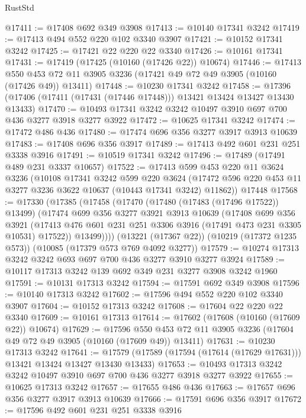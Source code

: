 \begin{lexlean}{RustStd}
\begin{coremodule}
@17411 := @17408 @692 @349 @3908
@17413 := @10140 @17341 @3242
@17419 := @17413 @494 @552 @220 @102 @3340 @3907
@17421 := @10152 @17341 @3242
@17425 := @17421 @22 @220 @22 @3340
@17426 := @10161 @17341
@17431 := @17419 (@17425 (@10160 (@17426 @22)) @10674)
@17446 := @17413
    @550
    @453
    @72
    @11
    @3905
    @3236
    (@17421 @49 @72 @49 @3905 (@10160 (@17426 @49)) @13411)
@17448 := @10230 @17341 @3242
@17458 := @17396 (@17406 (@17411 (@17431 (@17446 @17448))) @13421 @13424 @13427 @13430 @13433)
@17470 := @10493 @17341 @3242 @3242 @10497 @3910 @697 @700 @436 @3277 @3918 @3277 @3922
@17472 := @10625 @17341 @3242
@17474 := @17472 @486 @436
@17480 := @17474 @696 @356 @3277 @3917 @3913 @10639
@17483 := @17408 @696 @356 @3917
@17489 := @17413 @492 @601 @231 @251 @3338 @3916
@17491 := @10519 @17341 @3242
@17496 := @17489 (@17491 @489 @231 @3337 @10657)
@17522 := @17413
    @599
    @453
    @220
    @11
    @3624
    @3236
    (@10108
      @17341
      @3242
      @599
      @220
      @3624
      (@17472 @596 @220 @453 @11 @3277 @3236 @3622 @10637 (@10443 @17341 @3242) @11862))
    @17448
@17568 := @17330
    (@17385
      (@17458
        (@17470
          (@17480 (@17483 (@17496 @17522)) @13499)
          (@17474
            @699
            @356
            @3277
            @3921
            @3913
            @10639
            (@17408
              @699
              @356
              @3921
              (@17413 @476 @601 @231 @251 @3306 @3916 (@17491 @473 @231 @3305 @10531) @17522))
            @13499))))
    (@13221 (@17367 @22))
    (@10219 (@17372 @1235 @573))
    (@10085 (@17379 @573 @769 @4092 @3277))
@17579 := @10274 @17313 @3242 @3242 @693 @697 @700 @436 @3277 @3910 @3277 @3924
@17589 := @10117 @17313 @3242 @139 @692 @349 @231 @3277 @3908 @3242 @1960
@17591 := @10131 @17313 @3242
@17594 := @17591 @692 @349 @3908
@17596 := @10140 @17313 @3242
@17602 := @17596 @494 @552 @220 @102 @3340 @3907
@17604 := @10152 @17313 @3242
@17608 := @17604 @22 @220 @22 @3340
@17609 := @10161 @17313
@17614 := @17602 (@17608 (@10160 (@17609 @22)) @10674)
@17629 := @17596
    @550
    @453
    @72
    @11
    @3905
    @3236
    (@17604 @49 @72 @49 @3905 (@10160 (@17609 @49)) @13411)
@17631 := @10230 @17313 @3242
@17641 := @17579 (@17589 (@17594 (@17614 (@17629 @17631))) @13421 @13424 @13427 @13430 @13433)
@17653 := @10493 @17313 @3242 @3242 @10497 @3910 @697 @700 @436 @3277 @3918 @3277 @3922
@17655 := @10625 @17313 @3242
@17657 := @17655 @486 @436
@17663 := @17657 @696 @356 @3277 @3917 @3913 @10639
@17666 := @17591 @696 @356 @3917
@17672 := @17596 @492 @601 @231 @251 @3338 @3916

\end{coremodule}
\end{lexlean}

